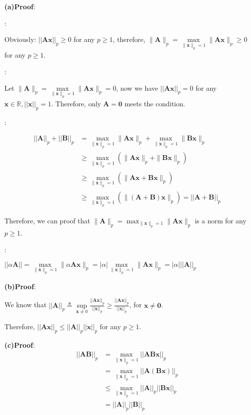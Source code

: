 \documentclass[12pt, a4paper, UTF8]{ctexart}
\begin{document}
\begin{enumerate}
		\textbf{(a)Proof}:
		
		:

		Obviously: $||\bm{Ax}||_p \geq 0$ for any $p \geq 1$, therefore, $\|\bm{A}\|_{p}=\max\limits_{\|\bm{x}\|_{p}=1}\|\bm{Ax}\|_{p} \geq 0$ for any $p\geq 1$.
		
		:

		Let $\| \bm{A}\|_{p}=\max\limits_{\| \bm{x}\|_{p}=1}\| \bm{Ax}\|_{p} = 0$, now we have $||\bm{Ax}||_p=0$ for any $\bm{x} \in \mathbb{R}, ||\bm{x}||_p=1$. Therefore, only $\bm{A} = \bm{0}$ meets the condition. 
		
		
		:

		\begin{align*}
			||\bm{A}||_p+||\bm{B}||_p &=\max \limits_{\| \bm{x}\|_{p}=1}\| \bm{Ax}\|_{p}+\max \limits_{\| \bm{x}\|_{p}=1}\| \bm{Bx}\|_{p} \\
			&\geq\max\limits_{\|\bm{x}\|_{p}=1}(\|\bm{Ax}\|_{p}+\|\bm{Bx}\|_{p}) \\ 
			&\geq\max\limits_{\|\bm{x}\|_{p}=1}(\|\bm{Ax} + \bm{Bx}\|_{p}) \\
			&\geq \max\limits_{\| \bm{x}\|_{p}=1}(\| (\bm{A}+\bm{B})\bm{x}\|_{p})=||\bm{A}+\bm{B}||_p
		\end{align*}
		
		Therefore, we can proof that  $\displaystyle \| \bm{A}\|_{p}=\max_{\| \bm{x}\|_{p}=1}\| \bm{Ax}\|_{p}$ is a norm for any $p\geq 1$.
		
		
		:

		$||\alpha\bm{A}||=\max\limits_{\|\bm{x}\|_{p}=1}\|\alpha\bm{Ax}\|_{p}=|\alpha|\max\limits_{\|\bm{x}\|_{p}=1}\|\bm{Ax}\|_{p}=|\alpha|||\bm{A}||_p$

		\textbf{(b)Proof}:

		We know that $||\bm{A}||_p\triangleq\mathop{sup}\limits_{\bm{x} \neq 0}\frac{||\bm{Ax}||_p}{||\bm{x}||_p} \geq\frac{||\bm{Ax}||_p}{||\bm{x}||_p}$, for $\bm{x}\neq\bm{0}$.

		Therefore, $||\bm{Ax}||_p \leq ||\bm{A}||_p ||\bm{x}||_p$ for any $p \geq 1$.
		
		\textbf{(c)Proof}:
		\begin{align*}
			||\bm{AB}||_p &= \mathop {max} \limits_{\|\bm{x}\|_p = 1} ||\bm{ABx}||_p \\
			&= \mathop {max} \limits_{\|\bm{x}\|_p = 1} ||\bm{A(Bx)}||_p \\
			&\leqslant \mathop {max} \limits_{\|\bm{x}\|_p = 1} ||\bm{A}||_p||\bm{Bx}||_p \\
			&=||\bm{A}||_p||\bm{B}||_p
		\end{align*}
		

\end{enumerate}
\end{document}
